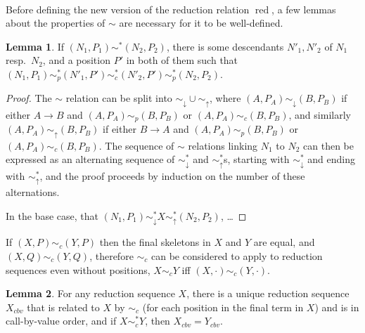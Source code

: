 \documentclass{article}
\DeclareMathOperator{\red}{red}
\theoremstyle{definition}
\theoremstyle{lemma}
\newtheorem{lemma}{Lemma}
\theoremstyle{remark}
\begin{document}
\paragraph{}
Before defining the new version of the reduction relation $\red$, a few lemmas about the properties of $\sim$ are necessary for it to be well-defined.

\begin{lemma} \label{downAcrossUp}
If $(N_1,P_1) \sim^* (N_2,P_2)$, there is some descendants $N'_1, N'_2$ of $N_1$ resp.~$N_2$, and a position $P'$ in both of them such that $(N_1,P_1) \sim_p^* (N'_1, P') \sim_c^* (N'_2, P') \sim_p^* (N_2, P_2)$.
\end{lemma}
\begin{proof}
The $\sim$ relation can be split into $\sim_\downarrow \cup \sim_\uparrow$, where $(A,P_A) \sim_\downarrow (B,P_B)$ if either $A \to B$ and $(A,P_A) \sim_p (B,P_B)$ or $(A,P_A) \sim_c (B,P_B)$, and similarly $(A,P_A) \sim_\uparrow (B,P_B)$ if either $B \to A$ and $(A,P_A) \sim_p (B,P_B)$ or $(A,P_A) \sim_c (B,P_B)$. The sequence of $\sim$ relations linking $N_1$ to $N_2$ can then be expressed as an alternating sequence of $\sim_\downarrow^*$ and $\sim_\uparrow^*$s, starting with $\sim_\downarrow^*$ and ending with $\sim_\uparrow^*$, and the proof proceeds by induction on the number of these alternations.

In the base case, that $(N_1,P_1) \sim_\downarrow^* X \sim_\uparrow^* (N_2,P_2)$, \dots

\end{proof}


If $(X,P) \sim_c (Y,P)$ then the final skeletons in $X$ and $Y$ are equal, and $(X,Q) \sim_c (Y,Q)$, therefore $\sim_c$ can be considered to apply to reduction sequences even without positions, $X \sim_c Y$ iff $(X,\cdot) \sim_c (Y,\cdot)$.

\begin{lemma} \label{canonicalCousins}
For any reduction sequence $X$, there is a unique reduction sequence $X_{cbv}$ that is related to $X$ by $\sim_c$ (for each position in the final term in $X$) and is in call-by-value order, and if $X \sim_c^* Y$, then $X_{cbv} = Y_{cbv}$.
\end{lemma}
\end{document}
